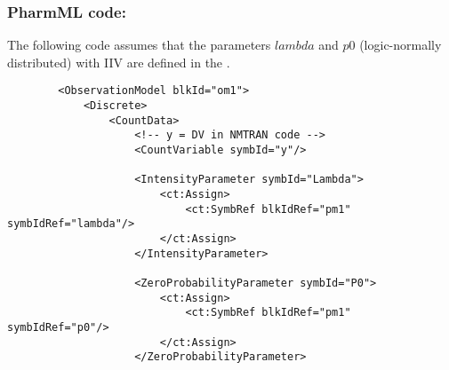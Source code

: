 \myEndLine

\subsubsection{PharmML code:}
The following code assumes that the parameters $lambda$ and $p0$ 
(logic-normally distributed) with IIV are defined in the .

\lstset{language=XML}
\begin{lstlisting}
        <ObservationModel blkId="om1">
            <Discrete>
                <CountData>
                    <!-- y = DV in NMTRAN code -->
                    <CountVariable symbId="y"/>
                    
                    <IntensityParameter symbId="Lambda">
                        <ct:Assign>
                            <ct:SymbRef blkIdRef="pm1" symbIdRef="lambda"/>
                        </ct:Assign>
                    </IntensityParameter>
                    
                    <ZeroProbabilityParameter symbId="P0">
                        <ct:Assign>
                            <ct:SymbRef blkIdRef="pm1" symbIdRef="p0"/>
                        </ct:Assign>
                    </ZeroProbabilityParameter>
                    

\end{lstlisting}
